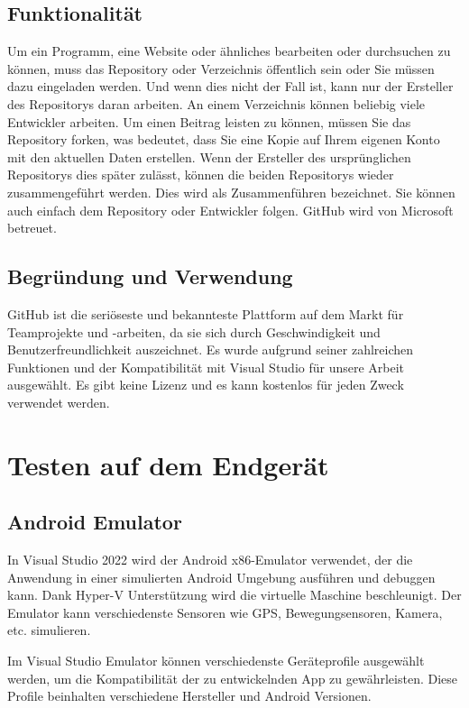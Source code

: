 \subsection*{Funktionalität}
Um ein Programm, eine Website oder ähnliches bearbeiten oder durchsuchen zu können, 
muss das Repository oder Verzeichnis öffentlich sein oder Sie müssen dazu eingeladen 
werden. Und wenn dies nicht der Fall ist, kann nur der Ersteller des Repositorys 
daran arbeiten. An einem Verzeichnis können beliebig viele Entwickler arbeiten. 
Um einen Beitrag leisten zu können, müssen Sie das Repository forken, was bedeutet, 
dass Sie eine Kopie auf Ihrem eigenen Konto mit den aktuellen Daten erstellen. 
Wenn der Ersteller des ursprünglichen Repositorys dies später zulässt, können die 
beiden Repositorys wieder zusammengeführt werden. Dies wird als Zusammenführen 
bezeichnet. Sie können auch einfach dem Repository oder Entwickler folgen. 
GitHub wird von Microsoft betreuet.
\subsection*{Begründung und Verwendung}
GitHub ist die seriöseste und bekannteste Plattform auf dem Markt für Teamprojekte 
und -arbeiten, da sie sich durch Geschwindigkeit und Benutzerfreundlichkeit 
auszeichnet. Es wurde aufgrund seiner zahlreichen Funktionen und der Kompatibilität 
mit Visual Studio für unsere Arbeit ausgewählt. Es gibt keine Lizenz und es kann 
kostenlos für jeden Zweck verwendet werden.
\newpage

\newpage
\section{Testen auf dem Endgerät}
\subsection{Android Emulator}
\cite{AndroidEmulator}
In Visual Studio 2022 wird der Android x86-Emulator verwendet, der die Anwendung in einer simulierten Android Umgebung ausführen 
und debuggen kann. Dank Hyper-V Unterstützung wird die virtuelle Maschine beschleunigt. 
Der Emulator kann verschiedenste Sensoren wie GPS, Bewegungsensoren, Kamera, etc. simulieren.

Im Visual Studio Emulator können verschiedenste Geräteprofile ausgewählt werden, um die Kompatibilität der zu entwickelnden App zu 
gewährleisten. Diese Profile beinhalten verschiedene Hersteller und Android Versionen.

